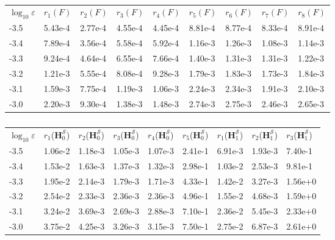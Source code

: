 \documentclass[12pt,reqno]{amsart}
\theoremstyle{plain}
\numberwithin{equation}{section}
\theoremstyle{remark}
\begin{document}
\begin{table}[t]
\centering
\begin{minipage}{\textwidth}
\centering
\begin{tabular}{l!{\vrule width 1pt}w{c}{1.5cm}w{c}{1.5cm}w{c}{1.5cm}w{c}{1.5cm}w{c}{1.5cm}w{c}{1.5cm}w{c}{1.5cm}w{c}{1.5cm}}
\toprule
$\log_{10}\varepsilon$ & {$r_1({F})$} & {$r_2({F})$} & {$r_3({F})$} & {$r_4({F})$} & {$r_5({F})$} & {$r_6({F})$} & {$r_7({F})$} & {$r_8({F})$} \\
-3.5 & 5.43e-4 & 2.77e-4 & 4.55e-4 & 4.45e-4 & 8.81e-4 & 8.77e-4 & 8.33e-4 & 8.91e-4 \\
-3.4 & 7.89e-4 & 3.56e-4 & 5.58e-4 & 5.92e-4 & 1.16e-3 & 1.26e-3 & 1.08e-3 & 1.14e-3 \\
-3.3 & 9.24e-4 & 4.64e-4 & 6.55e-4 & 7.66e-4 & 1.40e-3 & 1.31e-3 & 1.31e-3 & 1.22e-3 \\
-3.2 & 1.21e-3 & 5.55e-4 & 8.08e-4 & 9.28e-3 & 1.79e-3 & 1.83e-3 & 1.73e-3 & 1.84e-3 \\
-3.1 & 1.59e-3 & 7.75e-4 & 1.19e-3 & 1.06e-3 & 2.24e-3 & 2.34e-3 & 1.91e-3 & 2.10e-3 \\
-3.0 & 2.20e-3 & 9.30e-4 & 1.38e-3 & 1.48e-3 & 2.74e-3 & 2.75e-3 & 2.46e-3 & 2.65e-3 \\
\bottomrule
\end{tabular}
\end{minipage}
\begin{minipage}{\textwidth}
\centering
\begin{tabular}{
  l!{\vrule width 1pt}w{c}{1.5cm}w{c}{1.5cm}w{c}{1.5cm}w{c}{1.5cm}w{c}{1.5cm}!{\vrule width 1pt}w{c}{1.5cm}w{c}{1.5cm}w{c}{1.5cm}
}
\toprule
{$\log_{10}\varepsilon$} & 
{$r_1$($\mathbf{H}_0^{\mathscr{S}}$)} & {$r_2$($\mathbf{H}_0^{\mathscr{S}}$)} & {$r_3$($\mathbf{H}_0^{\mathscr{S}}$)} & {$r_4$($\mathbf{H}_0^{\mathscr{S}}$)} & {$r_5$($\mathbf{H}_0^{\mathscr{S}}$)} & 
{$r_1$($\mathbf{H}_1^{\mathscr{S}}$)} & {$r_2$($\mathbf{H}_1^{\mathscr{S}}$)} & {$r_3$($\mathbf{H}_1^{\mathscr{S}}$)} \\
-3.5 & 1.06e-2 & 1.18e-3 & 1.05e-3 & 1.07e-3 & 2.41e-1 & 6.91e-3 & 1.93e-3 & 7.40e-1 \\
-3.4 & 1.53e-2 & 1.63e-3 & 1.37e-3 & 1.32e-3 & 2.98e-1 & 1.03e-2 & 2.53e-3 & 9.81e-1 \\
-3.3 & 1.95e-2 & 2.14e-3 & 1.79e-3 & 1.71e-3 & 4.33e-1 & 1.42e-2 & 3.27e-3 & 1.56e+0 \\
-3.2 & 2.54e-2 & 2.33e-3 & 2.36e-3 & 2.36e-3 & 4.96e-1 & 1.55e-2 & 4.68e-3 & 1.59e+0 \\
-3.1 & 3.24e-2 & 3.69e-3 & 2.69e-3 & 2.88e-3 & 7.10e-1 & 2.36e-2 & 5.45e-3 & 2.33e+0 \\
-3.0 & 3.75e-2 & 4.25e-3 & 3.26e-3 & 3.15e-3 & 7.50e-1 & 2.75e-2 & 6.87e-3 & 2.61e+0 \\
\bottomrule
\end{tabular}
\end{minipage}
\caption{}
\label{tab}
\end{table}
\end{document}
